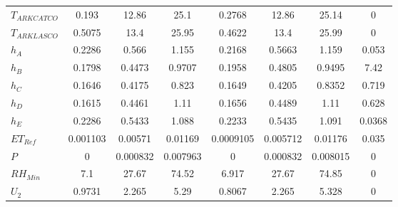 \begin{linenumbers}
\begin{table}[htbp]
\begin{tabular}{l|ccc|ccc|c}
	$T_{ARKCATCO}$&		0.193&	12.86&	25.1&	0.2768&	12.86&	25.14&	0\\                            
	$T_{ARKLASCO}$&		0.5075&	13.4&	25.95&	0.4622&	13.4&	25.99&	0\\                            
	$h_{A}$&			0.2286&	0.566&	1.155&	0.2168&	0.5663&	1.159&	0.053\\                        
	$h_{B}$&			0.1798&	0.4473&	0.9707&	0.1958&	0.4805&	0.9495&	7.42\\                         
	$h_{C}$&			0.1646&	0.4175&	0.823&	0.1649&	0.4205&	0.8352&	0.719\\                        
	$h_{D}$&			0.1615&	0.4461&	1.11&	0.1656&	0.4489&	1.11&	0.628\\                        
	$h_{E}$&			0.2286&	0.5433&	1.088&	0.2233&	0.5435&	1.091&	0.0368\\                       
	$ET_{Ref}$&			0.001103&	0.00571&	0.01169&	0.0009105&	0.005712&	0.01176&	0.035\\
	$P$&				0&	0.000832&	0.007963&	0&	0.000832&	0.008015&	0\\                    
	$RH_{Min}$&			7.1&	27.67&	74.52&	6.917&	27.67&	74.85&	0\\                            
	$U_{2}$&			0.9731&	2.265&	5.29&	0.8067&	2.265&	5.328&	0\\                            
    \bottomrule
    \end{tabular}
\end{table}


\end{linenumbers}
